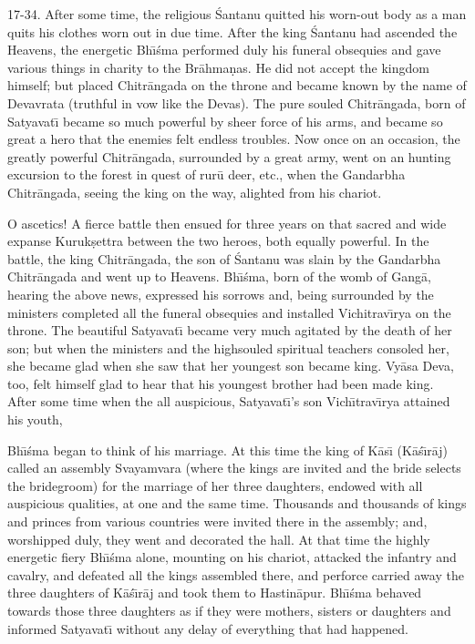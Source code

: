17-34. After some time, the religious \'Santanu quitted his worn-out body as a man quits his clothes worn out in due time. After the king \'Santanu had ascended the Heavens, the energetic Bh\={\i}\'sma performed duly his funeral obsequies and gave various things in charity to the Br\=ahma\d{n}as. He did not accept the kingdom himself; but placed Chitr\=angada on the throne and became known by the name of Devavrata (truthful in vow like the Devas). The pure souled Chitr\=angada, born of Satyavat\={\i} became so much powerful by sheer force of his arms, and became so great a hero that the enemies felt endless troubles. Now once on an occasion, the greatly powerful Chitr\=angada, surrounded by a great army, went on an hunting excursion to the forest in quest of rur\=u deer, etc., when the Gandarbha Chitr\=angada, seeing the king on the way, alighted from his chariot.

O ascetics! A fierce battle then ensued for three years on that sacred and wide expanse Kuruk\d{s}ettra between the two heroes, both equally powerful. In the battle, the king Chitr\=angada, the son of \'Santanu was slain by the Gandarbha Chitr\=angada and went up to Heavens. Bh\={\i}\'sma, born of the womb of Gang\=a, hearing the above news, expressed his sorrows and, being surrounded by the ministers completed all the funeral obsequies and installed Vichitrav\={\i}rya on the throne. The beautiful Satyavat\={\i} became very much agitated by the death of her son; but when the ministers and the highsouled spiritual teachers consoled her, she became glad when she saw that her youngest son became king. Vy\=asa Deva, too, felt himself glad to hear that his youngest brother had been made king. After some time when the all auspicious, Satyavat\={\i}'s son Vich\={\i}trav\={\i}rya attained his youth,

Bh\={\i}\'sma began to think of his marriage. At this time the king of K\=as\={\i} (K\=a\'s\={\i}r\=aj) called an assembly Svayamvara (where the kings are invited and the bride selects the bridegroom) for the marriage of her three daughters, endowed with all auspicious qualities, at one and the same time. Thousands and thousands of kings and princes from various countries were invited there in the assembly; and, worshipped duly, they went and decorated the hall. At that time the highly energetic fiery Bh\={\i}\'sma alone, mounting on his chariot, attacked the infantry and cavalry, and defeated all the kings assembled there, and perforce carried away the three daughters of K\=a\'s\={\i}r\=aj and took them to Hastin\=apur. Bh\={\i}\'sma behaved towards those three daughters as if they were mothers, sisters or daughters and informed Satyavat\={\i} without any delay of everything that had happened.

